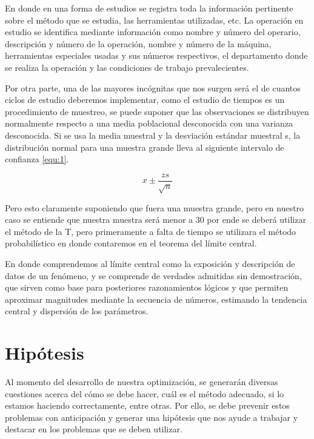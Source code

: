     
    En donde en una forma de estudios se registra toda la información pertinente sobre el método que se estudia, las herramientas utilizadas, etc. La operación en estudio se identifica mediante información como nombre y número del operario, descripción y número de la operación, nombre y número de la máquina, herramientas especiales usadas y sus números respectivos, el departamento donde se realiza la operación y las condiciones de trabajo prevalecientes. 
    \cite{niebel1980ingenieria}
    
    Por otra parte, una de las mayores incógnitas que nos surgen será el de cuantos ciclos de estudio deberemos implementar, como el estudio de tiempos es un procedimiento de muestreo, se puede suponer que las observaciones se distribuyen normalmente respecto a una media poblacional desconocida con una varianza desconocida. Si se usa la media muestral y la desviación estándar muestral s, la distribución normal para una muestra grande lleva al siguiente intervalo de confianza \ref{equ:1}. 
    
    \begin{equation}
        \label{equ:1}
        x {\pm} {\frac{zs}{\sqrt{n}}}
    \end{equation}
    
    Pero esto claramente suponiendo que fuera una muestra grande, pero en nuestro caso se entiende que nuestra muestra será menor a 30 por ende se deberá utilizar el método de la T, pero primeramente a falta de tiempo se utilizara el método probabilístico en donde contaremos en el teorema del límite central.
    
    En donde comprendemos al límite central como la exposición y descripción de datos de un fenómeno, y se comprende de verdades admitidas sin demostración, que sirven como base para posteriores razonamientos lógicos y que permiten aproximar magnitudes mediante la secuencia de números, estimando la tendencia central y dispersión de los parámetros. \cite{RAE}
    
    
    \section{Hipótesis}
    Al momento del desarrollo de nuestra optimización, se generarán diversas cuestiones acerca del cómo se debe hacer, cuál es el método adecuado, si lo estamos haciendo correctamente, entre otras. Por ello, se debe prevenir estos problemas con anticipación y generar una hipótesis que nos ayude a trabajar y destacar en los problemas que se deben utilizar.
    
